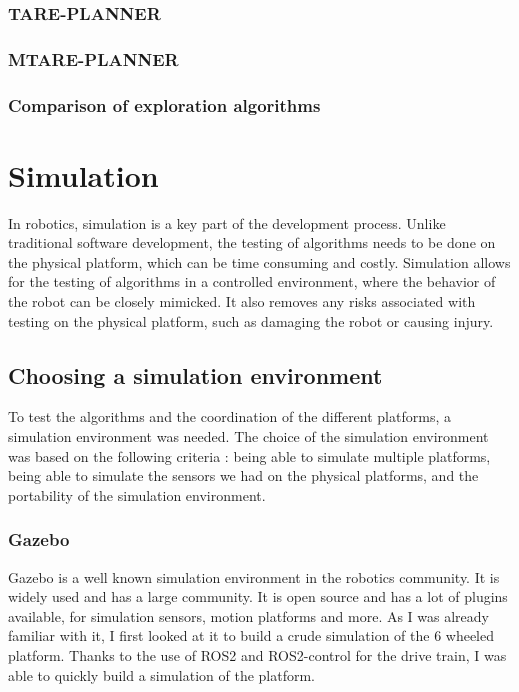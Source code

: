 \documentclass[11pt]{article}
\begin{document}
        \subsubsection{TARE-PLANNER}
        \subsubsection{MTARE-PLANNER}
        \subsubsection{Comparison of exploration algorithms}


    
\newpage
\section{Simulation}

    In robotics, simulation is a key part of the development process. Unlike traditional software development, the testing of algorithms needs to be done on the physical platform, which can be time consuming and costly. Simulation allows for the testing of algorithms in a controlled environment, where the behavior of the robot can be closely mimicked. It also removes any risks associated with testing on the physical platform, such as damaging the robot or causing injury. 

    \subsection{Choosing a simulation environment}

        To test the algorithms and the coordination of the different platforms, a simulation environment was needed. The choice of the simulation environment was based on the following criteria : being able to simulate multiple platforms, being able to simulate the sensors we had on the physical platforms, and the portability of the simulation environment.


        \subsubsection{Gazebo}
            Gazebo is a well known simulation environment in the robotics community. It is widely used and has a large community. It is open source and has a lot of plugins available, for simulation sensors, motion platforms and more. As I was already familiar with it, I first looked at it to build a crude simulation of the 6 wheeled platform. Thanks to the use of ROS2 and ROS2-control for the drive train, I was able to quickly build a simulation of the platform. 
\end{document}
